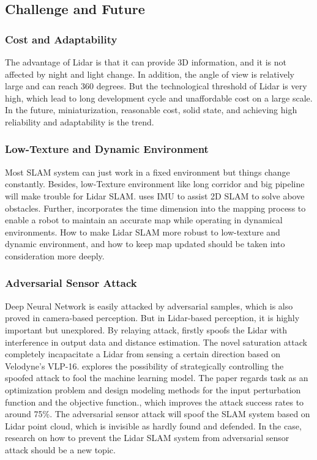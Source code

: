 \documentclass[journal,transmag]{IEEEtran}
\begin{document}
\subsection{Challenge and Future}
\subsubsection{Cost and Adaptability}
The advantage of Lidar is that it can provide 3D information, and it is not affected by night and light change. In addition, the angle of view is relatively large and can reach 360 degrees.
But the technological threshold of Lidar is very high, which lead to long development cycle and unaffordable cost on a large scale. In the future, miniaturization, reasonable cost, solid state, and achieving high reliability and adaptability is the trend.
\subsubsection{Low-Texture and Dynamic Environment}
Most SLAM system can just work in a fixed environment but things change constantly. Besides, low-Texture environment like long corridor and big pipeline will make trouble for Lidar SLAM. 
\cite{wang2018imu} uses IMU to assist 2D SLAM to solve above obstacles. Further, \cite{walcott2012dynamic} incorporates the time dimension into the mapping process to enable a robot to maintain an accurate map while operating in dynamical environments. How to make Lidar SLAM more robust to low-texture and dynamic environment, and how to keep map updated should be taken into consideration more deeply.
\subsubsection{Adversarial Sensor Attack}
Deep Neural Network is easily attacked by adversarial samples, which is also proved in  camera-based perception. But in Lidar-based perception, it is highly important but unexplored. By relaying attack, \cite{shin2017illusion} firstly spoofs the Lidar with interference in output data and distance estimation. The novel saturation attack completely incapacitate a Lidar from sensing a certain direction based on Velodyne’s VLP-16. \cite{cao2019adversarial} explores the possibility of strategically controlling the spoofed attack to fool the machine learning model. The paper regards task as an optimization problem and design modeling methods for the input perturbation function and the objective function., which improves the attack success rates to around 75\%. The adversarial sensor attack will spoof the SLAM system based on Lidar point cloud, which is invisible as hardly found and defended. In the case, research on how to prevent the Lidar SLAM system from adversarial sensor attack should be a new topic.
\end{document}
